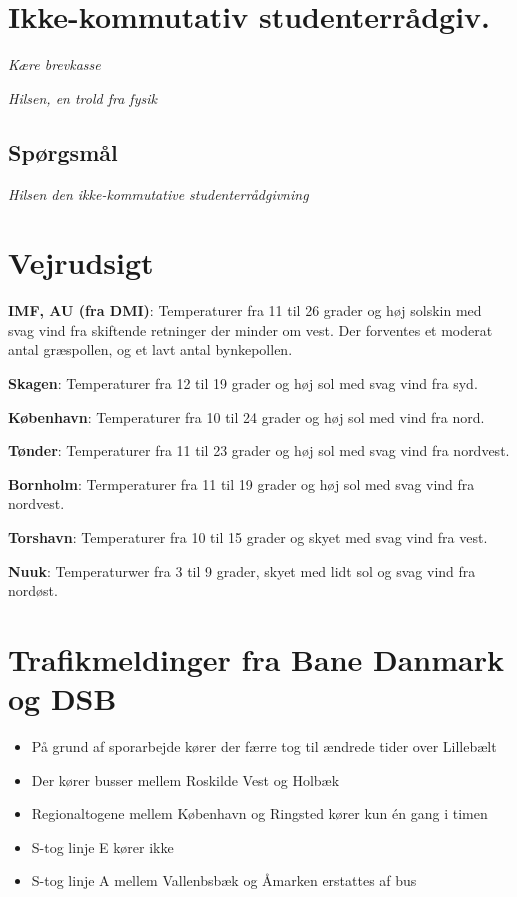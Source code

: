 

\begin{minipage}[b]{0.95\linewidth}
\begin{minipage}[t]{0.47\textwidth}
\vspace{1mm}
\section*{Ikke-kommutativ studenterrådgiv.}
\emph{Kære brevkasse}


\emph{Hilsen, en trold fra fysik}

\subsection*{Spørgsmål}


{\flushright\emph{Hilsen den ikke-kommutative studenterrådgivning}}

\end{minipage}%
\hfill\begin{minipage}[t]{0.47\textwidth}
\vspace{2mm}
\section*{Vejrudsigt}
\textbf{IMF, AU (fra DMI)}: Temperaturer fra 11 til 26 grader og høj solskin med svag vind fra skiftende retninger der minder om vest. Der forventes et moderat antal græspollen, og et lavt antal bynkepollen.

\textbf{Skagen}: Temperaturer fra 12 til 19 grader og høj sol med svag vind fra syd.

\textbf{København}: Temperaturer fra 10 til 24 grader og høj sol med vind fra nord.

\textbf{Tønder}: Temperaturer fra 11 til 23 grader og høj sol med svag vind fra nordvest.

\textbf{Bornholm}: Termperaturer fra 11 til 19 grader og høj sol med svag vind fra nordvest.

\textbf{Torshavn}: Temperaturer fra 10 til 15 grader og skyet med svag vind fra vest.

\textbf{Nuuk}: Temperaturwer fra 3 til 9 grader, skyet med lidt sol og svag vind fra nordøst.

\section*{Trafikmeldinger fra Bane Danmark og DSB}
\begin{itemize}
\item På grund af sporarbejde kører der færre tog til ændrede tider over Lillebælt
\item Der kører busser mellem Roskilde Vest og Holbæk
\item Regionaltogene mellem København og Ringsted kører kun én gang i timen
\item S-tog linje E kører ikke
\item S-tog linje A mellem Vallenbsbæk og Åmarken erstattes af bus
\end{itemize}


\end{minipage}
\end{minipage}
